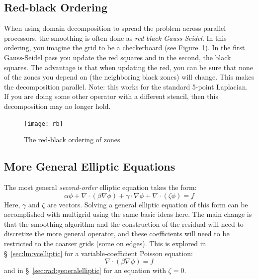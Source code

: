 \label{sec:multigrid:other}

\subsection{Red-black Ordering}

When using domain decomposition to spread the problem across parallel
processors, the smoothing is often done as {\em red-black
  Gauss-Seidel}.  In this ordering, you imagine the grid to be a
checkerboard (see Figure~\ref{fig:rb}).  In the first Gauss-Seidel
pass you update the red squares and in the second, the black squares.
The advantage is that when updating the red, you can be sure that none
of the zones you depend on (the neighboring black zones) will change.
This makes the decomposition parallel.  Note: this works for the
standard 5-point Laplacian.  If you are doing some other operator with
a different stencil, then this decomposition may no longer hold.

\begin{figure}[t]
  \centering
  \texttt{[image: rb]}
  \caption[Red-black ordering of zones]
{\label{fig:rb} The red-black ordering of zones.}
\end{figure}





\subsection{More General Elliptic Equations}

The most general {\em second-order} elliptic equation takes the form:
\begin{equation}
  \alpha \phi + \nabla \cdot (\beta \nabla \phi) +
  \gamma \cdot \nabla \phi + \nabla \cdot (\zeta \phi) = f
\end{equation}
Here, $\gamma$ and $\zeta$ are vectors.  Solving a general elliptic
equation of this form can be accomplished with multigrid using the
same basic ideas here.  The main change is that the smoothing
algorithm and the construction of the residual will need to discretize
the more general operator, and these coefficients will need to
be restricted to the coarser grids (some on edges).  This is explored in
\S~\ref{sec:lm:vcelliptic} for a variable-coefficient Poisson equation:
 \begin{equation}
 \nabla \cdot (\beta \nabla \phi) = f
 \end{equation}
\ifdefined\debugmode
and in \S~\ref{sec:rad:generalelliptic} for an equation with $\zeta = 0$.
\fi
